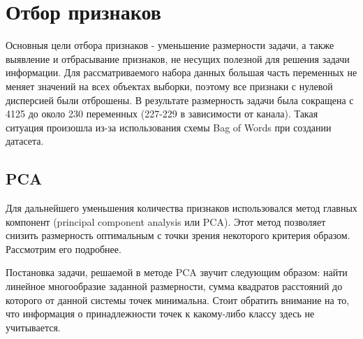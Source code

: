 \section{Отбор признаков}

\begin{Отбор признаков}
Основныя цели отбора признаков - уменьшение размерности задачи, а также выявление и отбрасывание признаков,
 не несущих полезной для решения задачи информации.
 Для рассматриваемого набора данных большая часть переменных не меняет значений на всех объектах выборки,
 поэтому все признаки с нулевой дисперсией были отброшены. В результате размерность задачи была сокращена
 с 4125 до около 230 переменных (227-229 в зависимости от канала). Такая ситуация произошла из-за использования схемы Bag of Words при создании датасета. 
 \subsection{PCA}
 \begin{PCA}
 Для дальнейшего уменьшения количества признаков использовался метод главных компонент
 (principal component analysis или PCA). Этот метод позволяет снизить размерность оптимальным с точки зрения некоторого критерия образом. Рассмотрим его подробнее.
 \par
 Постановка задачи, решаемой в методе PCA звучит следующим образом: найти линейное многообразие заданной 
 размерности, сумма квадратов расстояний до которого от данной системы точек минимальна. Стоит обратить внимание на то, что информация о принадлежности точек к какому-либо классу здесь не учитывается.
 
 \end{PCA}
 
\end{Отбор признаков}
